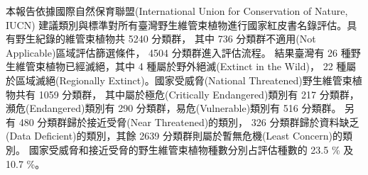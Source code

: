 \noindent 本報告依據國際自然保育聯盟(International Union for Conservation of Nature, IUCN)
建議類別與標準對所有臺灣野生維管束植物進行國家紅皮書名錄評估。具有野生紀錄的維管束植物共 5240 分類群，
其中 736 分類群不適用(Not Applicable)區域評估篩選條件， 4504 分類群進入評估流程。
結果臺灣有 26 種野生維管束植物已經滅絕，其中 4 種屬於野外絕滅(Extinct in the Wild)，
22 種屬於區域滅絕(Regionally Extinct)。國家受威脅(National Threatened)野生維管束植物共有 1059 分類群，
其中屬於極危(Critically Endangered)類別有 217 分類群，
瀕危(Endangered)類別有 290 分類群，易危(Vulnerable)類別有 516 分類群。
另有 480 分類群歸於接近受脅(Near Threatened)的類別，
326 分類群歸於資料缺乏(Data Deficient)的類別，其餘 2639 分類群則屬於暫無危機(Least Concern)的類別。
國家受威脅和接近受脅的野生維管束植物種數分別占評估種數的 23.5 \% 及 10.7 \%。 
